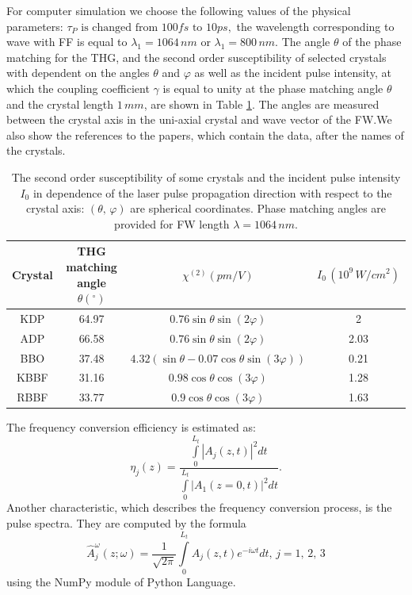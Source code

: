 \documentclass[a4paper, 12pt, onecolumn]{extarticle}
\begin{document}
For computer simulation we choose the following values of the physical parameters: \(\tau_P \text{ is changed from } 100fs\text{ to }10ps,\) the wavelength corresponding to wave with FF is equal to \(\lambda_1=1064\,nm\) or \(\lambda_1=800\,nm\).  The angle \(\theta\) of the phase matching for the THG, and the second order susceptibility of selected crystals with dependent on the angles \(\theta\) and \(\varphi\) as well as the incident pulse intensity, at which the coupling coefficient \(\gamma\) is equal to unity at the phase matching angle \(\theta\) and the crystal length $1\,mm$, are shown in Table \ref{tab:2}. The angles are measured between the crystal axis in the uni-axial crystal and wave vector of the FW.We also show the references to the papers, which contain the data, after the names of the crystals.

\begin{table}[h]
\caption{The second order susceptibility of some crystals and the incident pulse intensity $I_0$ in dependence of the laser pulse propagation direction with respect to the crystal axis: \((\theta,\,\varphi)\) are spherical coordinates. Phase matching angles are provided for FW length $\lambda=1064\,nm$. }
{\begin{tabular}{|c|c|c|c|} 
\hline
Crystal& THG matching angle $\theta (^{\circ})$& $\chi^{(2)} (pm/V)$ & $ I_0\,(10^9\,W/cm^2)$ \\
\hline
KDP \cite{bib:n26,bib:c4}& 64.97 & $0.76\sin\theta\sin(2\varphi)$ & 2 \\
\hline
ADP \cite{bib:n26,bib:c4}& 66.58& $0.76\sin\theta\sin(2\varphi)$ & 2.03 \\
\hline
BBO \cite{bib:c1,bib:c4}& 37.48& $4.32(\sin\theta-0.07\cos\theta\sin(3\varphi))$ & 0.21 \\
\hline
KBBF \cite{bib:c2,bib:c5}& 31.16& $0.98\cos\theta\cos(3\varphi)$ & 1.28 \\
\hline
RBBF \cite{bib:c3}&33.77& $0.9\cos\theta\cos(3\varphi)$ & 1.63 \\
\hline
\end{tabular}
\label{tab:2}}
\end{table}


The frequency conversion efficiency is estimated as:
\begin{equation}
\eta_j(z)=\frac{\int\limits_0^{L_t}|A_j(z,t)|^2dt}{\int\limits_0^{L_t}|A_1(z=0,t)|^2dt}.
\end{equation}
Another characteristic, which describes the frequency conversion process, is the pulse spectra. They are computed by the formula
\begin{equation}
\hat{A}_j^\omega(z;\omega)=\frac{1}{\sqrt{2\pi}}\int\limits_{0}^{L_t} A_j(z,t)e^{-i\omega t}dt,\,j=1,\,2,\,3
\end{equation}
using the NumPy module \cite{bib:np} of Python Language. 
\end{document}
